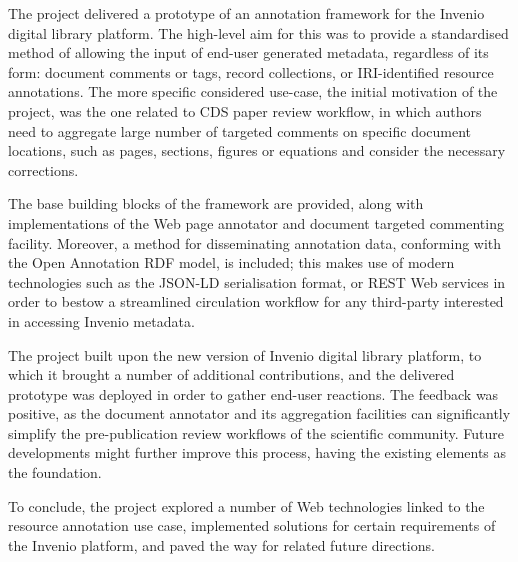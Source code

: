 
The project delivered a prototype of an annotation framework for the Invenio
digital library platform. The high-level aim for this was to provide a
standardised method of allowing the input of end-user generated metadata,
regardless of its form: document comments or tags, record collections, or
IRI-identified resource annotations. The more specific considered use-case, the
initial motivation of the project, was the one related to CDS paper review
workflow, in which authors need to aggregate large number of targeted comments
on specific document locations, such as pages, sections, figures or equations
and consider the necessary corrections.

The base building blocks of the framework are provided, along with
implementations of the Web page annotator and document targeted commenting
facility. Moreover, a method for disseminating annotation data, conforming with
the Open Annotation RDF model, is included; this makes use of modern
technologies such as the JSON-LD serialisation format, or REST Web services in
order to bestow a streamlined circulation workflow for any third-party
interested in accessing Invenio metadata.

The project built upon the new version of Invenio digital library platform, to
which it brought a number of additional contributions, and the delivered
prototype was deployed in order to gather end-user reactions. The feedback was
positive, as the document annotator and its aggregation facilities can
significantly simplify the pre-publication review workflows of the scientific
community. Future developments might further improve this process, having the
existing elements as the foundation.

To conclude, the project explored a number of Web technologies linked to the
resource annotation use case, implemented solutions for certain requirements of
the Invenio platform, and paved the way for related future directions.
